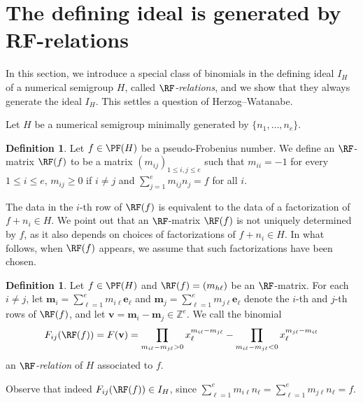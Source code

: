 \documentclass[11pt,twoside]{amsart}
\newcommand{\Z}{\mathbb Z}
\def\bv{{\mathbf v}}
\def\be{{\mathbf e}}
\def\bm{{\mathbf m}}
\theoremstyle{definition}
\newtheorem{defn}[Theorem]{Definition}
\numberwithin{equation}{section}
\begin{document}
\section{The defining ideal is generated by RF-relations}\label{SectionHW}



In this section, we introduce a special class of binomials in the defining ideal $I_H$ of a numerical semigroup $H$, called \emph{$\RF$-relations}, and we show that they always generate the ideal $I_H$.
This settles a question of Herzog--Watanabe.

Let $H$ 
be a numerical semigroup minimally generated by $\{n_1, \ldots, n_e\}$.
\begin{defn}
Let $f \in \PF(H)$ be a pseudo-Frobenius number.
We define  an $\RF$-matrix $\RF(f)$ to be a
 matrix $(m_{ij})_{1\leq i,j\leq e}$ such that 
 $m_{ii} = -1$ for every $1\le i\le e$, $m_{ij} \ge 0$ if $i \ne j$ and 
$\sum_{j=1}^e m_{ij}n_j = f$ for all $i$.
\end{defn}

The data in the $i$-th row of $\RF(f)$ is equivalent to the data of a factorization of $f+n_i \in H$.
We point out that 
an $\RF$-matrix $\RF(f)$ is not uniquely determined by $f$, as it also depends on choices of factorizations of $f+n_i \in H$.
In what follows, when $\RF(f)$ appears, we  assume that such factorizations have been chosen.




\begin{defn}\label{RF-rel} 
Let $f\in \PF(H)$ and $\RF(f)=(m_{h\ell})$ be an $\RF$-matrix.
For each $i\ne j$, let $\bm_i = \sum_{\ell=1}^e m_{i\ell}\be_\ell $ and
$\bm_j = \sum_{\ell=1}^e m_{j\ell}\be_\ell $ 
denote the $i$-th and $j$-th rows of $\RF(f)$, and let $\bv = \bm_i - \bm_j \in \Z^e$.
We call the binomial
$$
F_{ij}(\RF(f)) = F(\bv) = \prod_{m_{i\ell}-m_{j\ell}>0} x_\ell^{m_{i\ell}-m_{j\ell}} 
- \prod_{m_{i\ell}-m_{j\ell}<0} x_\ell^{m_{j\ell}-m_{i\ell}}
$$
an {\em $\RF$-relation} of $H$ associated to $f$.
\end{defn}
Observe that  indeed $F_{ij}(\RF(f))\in I_H$, since $\sum_{\ell =1}^e m_{i\ell}n_\ell = \sum_{\ell=1}^e m_{j\ell} n_\ell =f$. 
 
\end{document}

